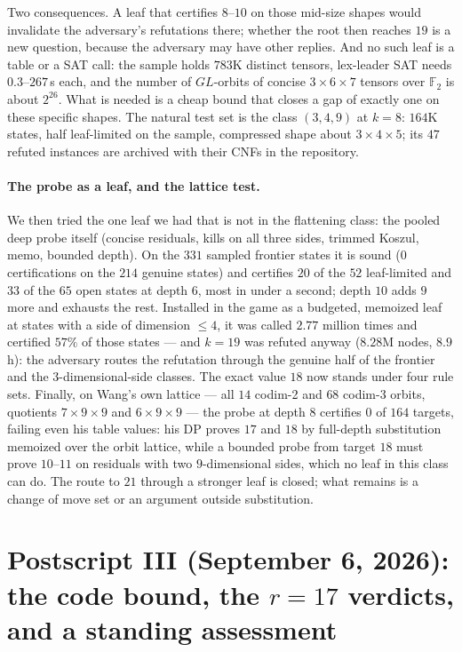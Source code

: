 \documentclass[11pt]{article}
\theoremstyle{definition}
\newcommand{\F}{\mathbb{F}_2}
\begin{document}
Two consequences. A leaf that certifies $8$--$10$ on those mid-size shapes
would invalidate the adversary's refutations there; whether the root then
reaches $19$ is a new question, because the adversary may have other
replies. And no such leaf is a table or a SAT call: the sample holds $783$K
distinct tensors, lex-leader SAT needs $0.3$--$267$\,s each, and the number
of $GL$-orbits of concise $3\times 6\times 7$ tensors over $\F$ is about
$2^{26}$. What is needed is a cheap bound that closes a gap of exactly one
on these specific shapes. The natural test set is the class $(3,4,9)$ at
$k=8$: $164$K states, half leaf-limited on the sample, compressed shape about
$3\times 4\times 5$; its $47$ refuted instances are archived with their CNFs
in the repository.

\paragraph{The probe as a leaf, and the lattice test.} We then tried the
one leaf we had that is not in the flattening class: the pooled deep
probe itself (concise residuals, kills on all three sides, trimmed Koszul,
memo, bounded depth). On the $331$ sampled frontier states it is sound
($0$ certifications on the $214$ genuine states) and certifies $20$ of the
$52$ leaf-limited and $33$ of the $65$ open states at depth $6$, most in
under a second; depth $10$ adds $9$ more and exhausts the rest. Installed in
the game as a budgeted, memoized leaf at states with a side of dimension
$\le 4$, it was called $2.77$ million times and certified $57\%$ of those
states --- and $k=19$ was refuted anyway ($8.28$M nodes, $8.9$\,h): the
adversary routes the refutation through the genuine half of the frontier
and the $3$-dimensional-side classes. The exact value $18$ now stands under
four rule sets. Finally, on Wang's own lattice --- all $14$ codim-2 and $68$
codim-3 orbits, quotients $7\times 9\times 9$ and $6\times 9\times 9$ --- the
probe at depth $8$ certifies $0$ of $164$ targets, failing even his table
values: his DP proves $17$ and $18$ by full-depth substitution memoized over
the orbit lattice, while a bounded probe from target $18$ must prove
$10$--$11$ on residuals with two $9$-dimensional sides, which no leaf in this
class can do. The route to $21$ through a stronger leaf is closed; what
remains is a change of move set or an argument outside substitution.


\section{Postscript III (September 6, 2026): the code bound, the $r=17$
verdicts, and a standing assessment}
\label{sec:postscript3}
\end{document}
